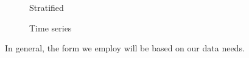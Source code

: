 \documentclass[
  letterpaper,
]{krantz}
\begin{document}
\begin{figure}
\begin{minipage}[t]{0.50\linewidth}
{\centering 


\caption{Stratified}

}

\end{minipage}%
%
\begin{minipage}[t]{0.50\linewidth}

{\centering 


\caption{Time series}

}

\end{minipage}%

\end{figure}

In general, the form we employ will be based on our data needs.
\end{document}
